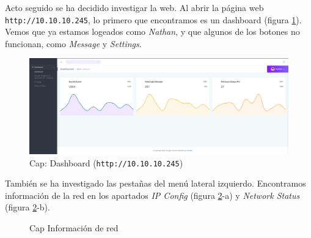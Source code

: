 Acto seguido se ha decidido investigar la web. Al abrir la página web \texttt{http://10.10.10.245}, lo primero que encontramos es un dashboard (figura \ref{fig:cap-dashboard}). Vemos que ya estamos logeados como \textit{Nathan}, y que algunos de los botones no funcionan, como \textit{Message} y \textit{Settings}.
\begin{figure}[h]
    \centering
    \includegraphics[width=1.0\textwidth]{images/machines/cap/web-dashboard.png}
    \caption{Cap: Dashboard (\texttt{http://10.10.10.245})}
    \label{fig:cap-dashboard}
\end{figure}

También se ha investigado las pestañas del menú lateral izquierdo. Encontramos información de la red en los apartados \textit{IP Config} (figura \ref{fig:cap-net}-a) y \textit{Network Status} (figura \ref{fig:cap-net}-b).

\begin{figure}
    \centering
    \qquad
    \caption{Cap Información de red}
    \label{fig:cap-net}
\end{figure}

